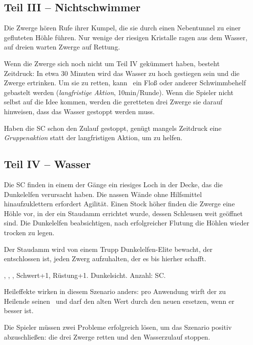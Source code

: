 {		\subsection{Teil III -- Nichtschwimmer}

		Die Zwerge hören Rufe ihrer Kumpel, die sie durch einen Nebentunnel zu einer gefluteten Höhle führen. Nur wenige der riesigen Kristalle ragen aus dem Wasser, auf dreien warten Zwerge auf Rettung.

		Wenn die Zwerge sich noch nicht um Teil IV gekümmert haben, besteht Zeitdruck: In etwa 30 Minuten wird das Wasser zu hoch gestiegen sein und die Zwerge ertrinken. Um sie zu retten, kann \zB\ ein Floß oder anderer Schwimmbehelf gebastelt werden (\emph{langfristige Aktion}, 10min/Runde). Wenn die Spieler nicht selbst auf die Idee kommen, werden die geretteten drei Zwerge sie darauf hinweisen, dass das Wasser gestoppt werden muss.

		Haben die SC schon den Zulauf gestoppt, genügt mangels Zeitdruck eine \emph{Gruppenaktion} statt der langfristigen Aktion, um zu helfen.

		\subsection{Teil IV -- Wasser}

		Die SC finden in einem der Gänge ein riesiges Loch in der Decke, das die Dunkelelfen verursacht haben. Die nassen Wände ohne Hilfsmittel hinaufzuklettern erfordert Agilität. Einen Stock höher finden die Zwerge eine Höhle vor, in der ein Staudamm errichtet wurde, dessen Schleusen weit geöffnet sind. Die Dunkelelfen beabsichtigen, nach erfolgreicher Flutung die Höhlen wieder trocken zu legen.

		Der Staudamm wird von einem Trupp Dunkelelfen-Elite bewacht, der entschlossen ist, jeden Zwerg aufzuhalten, der es bis hierher schafft.

		 , , , Schwert+1, Rüstung+1. Dunkelsicht. Anzahl: SC.


		\noindent
		Heileffekte wirken in diesem Szenario anders: pro Anwendung wirft der zu Heilende seinen \HD\ und darf den alten Wert durch den neuen ersetzen, wenn er besser ist.


		\noindent
		Die Spieler müssen zwei Probleme erfolgreich lösen, um das Szenario positiv abzuschließen: die drei Zwerge retten und den Wasserzulauf stoppen.
}
